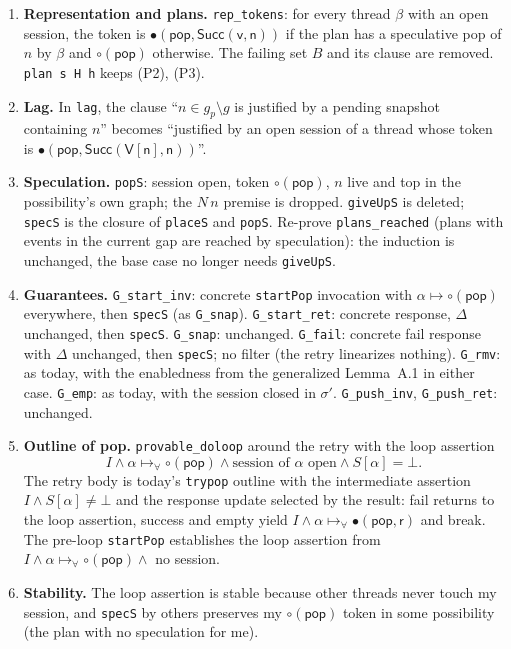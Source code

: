\documentclass[11pt]{article}
\theoremstyle{definition}
\theoremstyle{remark}
\newcommand{\code}[1]{\texttt{#1}}
\newcommand{\sol}[1]{\textbf{#1}}
\newcommand{\tok}[1]{\mathsf{#1}}
\newcommand{\Succ}{\mathsf{Succ}}
\begin{document}
\begin{enumerate}[nosep]
\item \sol{Representation and plans.} \code{rep\_tokens}: for every
  thread $\beta$ with an open session, the token is
  $\tok{\bullet(pop,\Succ(v,n))}$ if the plan has a speculative pop of
  $n$ by $\beta$ and $\tok{\circ(pop)}$ otherwise. The failing set $B$
  and its clause are removed. \code{plan s H h} keeps (P2), (P3).
\item \sol{Lag.} In \code{lag}, the clause ``$n \in g_p \setminus g$ is
  justified by a pending snapshot containing $n$'' becomes ``justified by
  an open session of a thread whose token is
  $\tok{\bullet(pop,\Succ(V[n],n))}$''.
\item \sol{Speculation.} \code{popS}: session open, token
  $\tok{\circ(pop)}$, $n$ live and top in the possibility's own graph;
  the $N\,n$ premise is dropped. \code{giveUpS} is deleted;
  \code{specS} is the closure of \code{placeS} and \code{popS}. Re-prove
  \code{plans\_reached} (plans with events in the current gap are reached
  by speculation): the induction is unchanged, the base case no longer
  needs \code{giveUpS}.
\item \sol{Guarantees.}
  \code{G\_start\_inv}: concrete \code{startPop} invocation with
  $\alpha \mapsto \tok{\circ(pop)}$ everywhere, then \code{specS}
  (as \code{G\_snap}).
  \code{G\_start\_ret}: concrete response, $\Delta$ unchanged, then
  \code{specS}.
  \code{G\_snap}: unchanged.
  \code{G\_fail}: concrete fail response with $\Delta$ unchanged, then
  \code{specS}; no filter (the retry linearizes nothing).
  \code{G\_rmv}: as today, with the enabledness from the generalized
  Lemma~A.1 in either case.
  \code{G\_emp}: as today, with the session closed in $\sigma'$.
  \code{G\_push\_inv}, \code{G\_push\_ret}: unchanged.
\item \sol{Outline of pop.} \code{provable\_doloop} around the retry with
  the loop assertion
  \[
  I \wedge \alpha \mapsto_\forall \tok{\circ(pop)} \wedge \text{session of } \alpha \text{ open} \wedge S[\alpha] = \bot .
  \]
  The retry body is today's \code{trypop} outline with the intermediate
  assertion $I \wedge S[\alpha] \ne \bot$ and the response update selected
  by the result: fail returns to the loop assertion, success and empty
  yield $I \wedge \alpha \mapsto_\forall \tok{\bullet(pop,r)}$ and break.
  The pre-loop \code{startPop} establishes the loop assertion from
  $I \wedge \alpha \mapsto_\forall \tok{\circ(pop)} \wedge$ no session.
\item \sol{Stability.} The loop assertion is stable because other
  threads never touch my session, and \code{specS} by others preserves
  my $\tok{\circ(pop)}$ token in some possibility (the plan with no
  speculation for me).
\end{enumerate}
\end{document}
